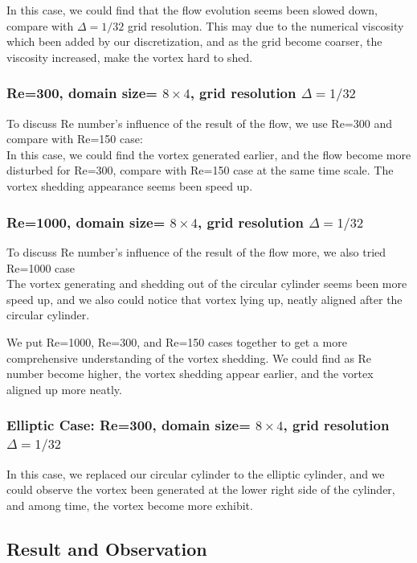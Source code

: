 \documentclass[12pt]{article}
\begin{document}
In this case, we could find that the flow evolution seems been slowed down, compare with $\Delta = 1/32$ grid resolution. This may due to the numerical viscosity which been added by our discretization, and as the grid become coarser, the viscosity increased, make the vortex hard to shed.


\subsubsection{Re=300, domain size= $8 \times 4$, grid resolution $\Delta = 1/32$}
To discuss Re number's influence of the result of the flow, we use Re=300 and compare with Re=150 case:\\

In this case, we could find the vortex generated earlier, and the flow become more disturbed
for Re=300, compare with Re=150 case at the same time scale. The vortex shedding appearance seems been speed up.

\subsubsection{Re=1000, domain size= $8 \times 4$, grid resolution $\Delta = 1/32$}
To discuss Re number's influence of the result of the flow more, we also tried Re=1000 case\\

The vortex generating and shedding out of the circular cylinder seems been more speed up, and we also could notice that vortex lying up, neatly aligned after the circular cylinder.

We put Re=1000, Re=300, and Re=150 cases together to get a more comprehensive understanding of the vortex shedding. We could find as Re number become higher, the vortex shedding appear earlier, and the vortex aligned up more neatly.

\subsubsection{Elliptic Case: Re=300, domain size= $8 \times 4$, grid resolution $\Delta = 1/32$}

In this case, we replaced our circular cylinder to the elliptic cylinder, and we could observe the vortex been generated at the lower right side of the cylinder, and among time, the vortex become more exhibit.



\subsection{Result and Observation}
\end{document}
